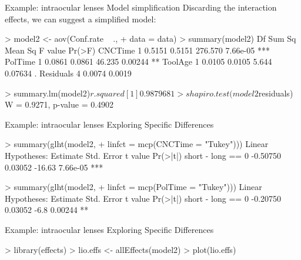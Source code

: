 \documentclass[t]{beamer}
\begin{document}

\begin{ftstf}
{Example: intraocular lenses}
{Model simplification}
Discarding the interaction effects, we can suggest a simplified model:
\begin{rcode}
> model2 <- aov(Conf.rate ~ .,
+               data = data)
> summary(model2)
            Df Sum Sq Mean Sq F value   Pr(>F)    
CNCTime      1 0.5151  0.5151 276.570 7.66e-05 ***
PolTime      1 0.0861  0.0861  46.235  0.00244 ** 
ToolAge      1 0.0105  0.0105   5.644  0.07634 .  
Residuals    4 0.0074  0.0019                     

> summary.lm(model2)$r.squared
[1] 0.9879681

> shapiro.test(model2$residuals)
W = 0.9271, p-value = 0.4902
\end{rcode}
\end{ftstf}


\begin{ftstf}
{Example: intraocular lenses}
{Exploring Specific Differences}
\begin{rcode}
> summary(glht(model2, 
+              linfct = mcp(CNCTime = "Tukey")))
Linear Hypotheses:
                  Estimate Std. Error t value Pr(>|t|)    
short - long == 0 -0.50750    0.03052  -16.63 7.66e-05 ***

> summary(glht(model2, 
+              linfct = mcp(PolTime = "Tukey")))
Linear Hypotheses:
                  Estimate Std. Error t value Pr(>|t|)   
short - long == 0 -0.20750    0.03052    -6.8  0.00244 **
\end{rcode}
\end{ftstf}


\begin{ftstf}
{Example: intraocular lenses}
{Exploring Specific Differences}
\begin{rcode}
> library(effects)
> lio.effs <- allEffects(model2)
> plot(lio.effs)
\end{rcode}
\end{ftstf}
\end{document}
